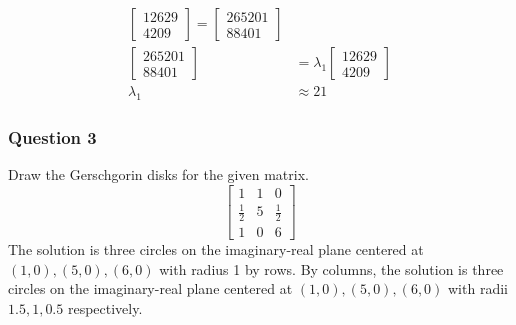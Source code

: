 \documentclass{math}
\begin{document}
\begin{align*}
\begin{bmatrix}
    12629 \\ 4209\end{bmatrix} = \begin{bmatrix}265201 \\ 88401\end{bmatrix} \\
  \begin{bmatrix}265201 \\ 88401\end{bmatrix} &= \lambda_1
    \begin{bmatrix}12629 \\ 4209\end{bmatrix} \\
  \lambda_1 &\approx 21
\end{align*}

\subsubsection*{Question 3}
Draw the Gerschgorin disks for the given matrix.
\[ \begin{bmatrix}
  1 & 1 & 0 \\
  \frac{1}{2} & 5 & \frac{1}{2} \\
  1 & 0 & 6
\end{bmatrix} \]
The solution is three circles on the imaginary-real plane centered at
\( (1,0), (5,0), (6,0) \) with radius 1 by rows. By columns, the solution
is three circles on the imaginary-real plane centered at
\( (1,0), (5,0), (6,0) \) with radii \( 1.5, 1, 0.5 \) respectively.
\end{document}

